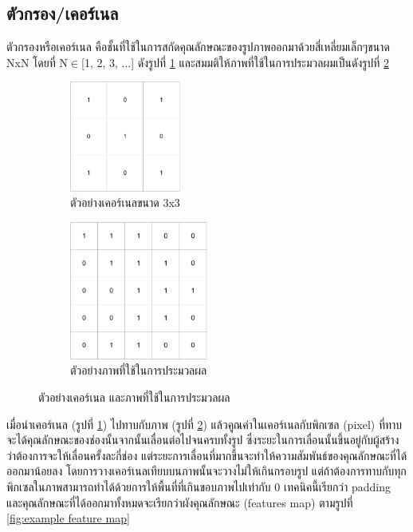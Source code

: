 \subsection*{ตัวกรอง/เคอร์เนล}
ตัวกรองหรือเคอร์เนล คือชั้นที่ใช้ในการสกัดคุณลักษณะของรูปภาพออกมาด้วยสี่เหลี่ยมเล็กๆขนาด NxN โดยที่ N$\in$[1, 2, 3, ...] ดังรูปที่ \ref{fig:kernel_3x3} 
และสมมติให้ภาพที่ใช้ในการประมวลผมเป็นดังรูปที่ \ref{fig:input_ex}
\begin{figure}[!ht]
	\centering
	\begin{subfigure}[b]{0.5\textwidth}
        \centering
        \includegraphics[width=0.4\textwidth]{chapter2/images/kernel_ex.png}
		\caption{ตัวอย่างเคอร์เนลขนาด 3x3}
		\label{fig:kernel_3x3}
    \end{subfigure}
    \begin{subfigure}[b]{0.5\textwidth}
        \centering
		\includegraphics[width=0.5\textwidth]{chapter2/images/input_ex.png}
		\caption{ตัวอย่างภาพที่ใช้ในการประมวลผล}
        \label{fig:input_ex}
	\end{subfigure}
	\caption{ตัวอย่างเคอร์เนล และภาพที่ใช้ในการประมวลผล}
	\label{fig:kernel_input_ex}
\end{figure}
\clearpage
เมื่อนำเคอร์เนล (รูปที่ \ref{fig:kernel_3x3}) ไปทาบกับภาพ (รูปที่ \ref{fig:input_ex}) แล้วคูณค่าในเคอร์เนลกับพิกเซล (pixel) ที่ทาบจะได้คุณลักษณะของช่องนั้นจากนั้นเลื่อนต่อไปจนครบทั้งรูป 
ซึ่งระยะในการเลื่อนนั้นขึ้นอยู่กับผู้สร้างว่าต้องการจะให้เลื่อนครั้งละกี่ช่อง แต่ระยะการเลื่อนที่มากขึ้นจะทำให้ความสัมพันธ์ของคุณลักษณะที่ได้ออกมาน้อยลง โดยการวางเคอร์เนลเทียบบนภาพนั้นจะวางไม่ให้เกินกรอบรูป 
แต่ถ้าต้องการทาบกับทุกพิกเซลในภาพสามารถทำได้ด้วยการให้พื้นที่ที่เกินขอบภาพไปเท่ากับ 0 เทคนิคนี้เรียกว่า padding และคุณลักษณะที่ได้ออกมาทั้งหมดจะเรียกว่าผังคุณลักษณะ (features map) ตามรูปที่ \ref{fig:example feature map}

